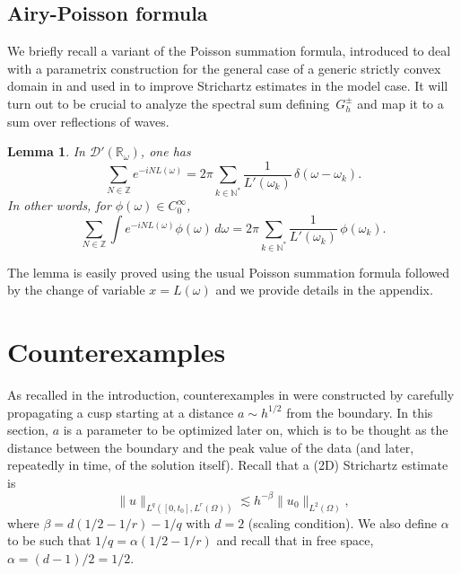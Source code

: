 \documentclass[11pt]{article}
\let\mathcal\mathscr
\newcommand\N{{\mathbb N}}
\newcommand\R{{\mathbb R}}
\newcommand\Z{{\mathbb Z}}
\theoremstyle{plain}
\newtheorem{lemma}{Lemma}
\theoremstyle{definition}
\begin{document}
\subsection{Airy-Poisson formula}
We briefly recall a variant of the Poisson summation formula, introduced to deal with a parametrix construction for the general case of a generic strictly convex domain in \cite{ILLP} and used in \cite{ILP3} to improve Strichartz estimates in the model case. It will turn out to be crucial to analyze the spectral sum defining~$G^{\pm}_{h}$ and map it to a sum over reflections of waves.
\begin{lemma}
\label{AiryPoisson}
In $\mathcal{D}'(\R_\omega)$, one has
\begin{equation*}
\label{eq:AiryPoisson}
\sum_{N\in \Z} e^{-i NL(\omega)}= 2\pi \sum_{k\in \N^*} \frac 1
{L'(\omega_k)}\, \delta(\omega-\omega_k).
\end{equation*}
In other words, for $\phi(\omega)\in C_{0}^{\infty}$,
\begin{equation}
\label{eq:AiryPoissonBis}
\sum_{N\in \Z} \int e^{-i NL(\omega)} \phi(\omega)\,d\omega = 2\pi \sum_{k\in \N^*} \frac 1
{L'(\omega_k)}\, \phi(\omega_k).
\end{equation}

\end{lemma}
The lemma is easily proved using the usual Poisson summation formula
followed by the change of variable $x=L(\omega)$ and we provide details in the appendix.

\section{Counterexamples}
As recalled in the introduction, counterexamples in \cite{doi} were constructed by carefully
propagating a cusp starting at a distance $a\sim h^{1/2}$ from the boundary. In this section, $a$ is a parameter to be optimized later on, which is to be thought as the distance between the boundary and the peak value of the data (and later, repeatedly in time, of the solution itself). Recall that a (2D) Strichartz estimate is
\begin{equation}
\label{eq:31}
\| u\|_{L^{q}([0,t_{0}],L^{r}(\Omega))}\lesssim h^{-\beta} \|u_{0}\|_{L^{2}(\Omega)},
\end{equation}
where $\beta=d(1/2-1/r)-1/q$ with $d=2$ (scaling condition). We also define $\alpha$ to be such that $1/q=\alpha(1/2-1/r)$ and recall that in free space, $\alpha=(d-1)/2=1/2$.
\end{document}
